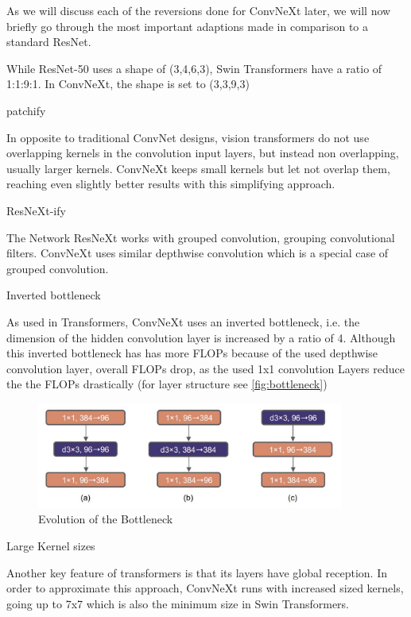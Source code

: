 \documentclass{article}
\begin{document}
As we will discuss each of the reversions done for ConvNeXt later, we will now briefly go through the most important adaptions made in comparison to a standard ResNet.

While ResNet-50 uses a shape of (3,4,6,3), Swin Transformers have a ratio of 1:1:9:1. In ConvNeXt, the shape is set to (3,3,9,3)

patchify

In opposite to traditional ConvNet designs, vision transformers do not use overlapping kernels in the convolution input layers, but instead non overlapping, usually larger kernels. ConvNeXt keeps small kernels but let not overlap them, reaching even slightly better results with this simplifying approach.

ResNeXt-ify

The Network ResNeXt works with grouped convolution, grouping convolutional filters. ConvNeXt uses similar depthwise convolution which is a special case of grouped convolution.

Inverted bottleneck

As used in Transformers, ConvNeXt uses an inverted bottleneck, i.e. the dimension of the hidden convolution layer is increased by a ratio of 4. Although this inverted bottleneck has has more FLOPs because of the used depthwise convolution layer, overall FLOPs drop, as the used 1x1 convolution Layers reduce the the FLOPs drastically (for layer structure see \autoref{fig:bottleneck})
\begin{figure}[h]
    \centering
    \includegraphics[width=0.9\textwidth]{images/bottleneck}
    \caption{Evolution of the Bottleneck}
    \label{fig:bottleneck}
\end{figure}

Large Kernel sizes

Another key feature of transformers is that its layers have global reception. In order to approximate this approach, ConvNeXt runs with increased sized kernels, going up to 7x7 which is also the minimum size in Swin Transformers.
\end{document}
